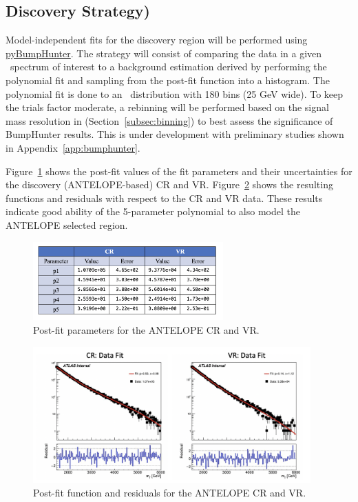 \subsection{Discovery Strategy)}
\label{subsec:fit_bh}

Model-independent fits for the discovery region will be performed using \href{https://github.com/scikit-hep/pyBumpHunter}{pyBumpHunter}.
The strategy will consist of comparing the data in a given \mt~spectrum of interest to a background estimation derived by performing the polynomial fit and sampling from the post-fit function into a histogram.
The polynomial fit is done to an \mt~distribution with 180 bins (25 GeV wide). %
To keep the trials factor moderate, a rebinning will be performed based on the signal mass resolution in \mt (Section~\ref{subsec:binning}) to best assess the significance of BumpHunter results.
This is under development with preliminary studies shown in Appendix~\ref{app:bumphunter}.

Figure~\ref{fig:postfit_param_antelope} shows the post-fit values of the fit parameters and their uncertainties for the discovery (ANTELOPE-based) CR and VR. 
Figure~\ref{fig:bkgfit_data_crvr_antelope} shows the resulting functions and residuals with respect to the CR and VR data.
These results indicate good ability of the 5-parameter polynomial to also model the ANTELOPE selected region.
\begin{figure}[!htbp]
\centering
   \includegraphics[width=0.65\textwidth]{figures/stats/postfit_param_antelope}
    \caption{Post-fit parameters for the ANTELOPE CR and VR.
    \label{fig:postfit_param_antelope}}
\end{figure}
\begin{figure}[!htbp]
\centering
   \includegraphics[width=0.95\textwidth]{figures/stats/bkgfit_data_crvr_antelope}
    \caption{Post-fit function and residuals for the ANTELOPE CR and VR.
    \label{fig:bkgfit_data_crvr_antelope}}
\end{figure}


